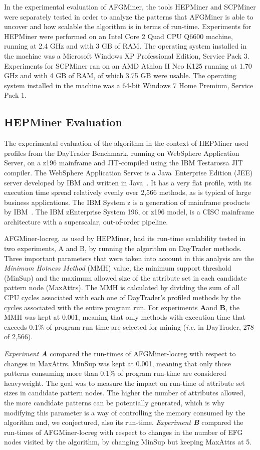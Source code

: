 In the experimental evaluation of AFGMiner, the tools HEPMiner and SCPMiner were separately tested in order to analyze the patterns that AFGMiner is able to uncover and how scalable the algorithm is in terms of run-time. Experiments for HEPMiner were performed on an Intel Core 2 Quad CPU Q6600 machine, running at 2.4 GHz and with 3 GB of RAM. The operating system installed in the machine was a Microsoft Windows XP Professional Edition, Service Pack 3. Experiments for SCPMiner ran on an AMD Athlon II Neo K125 running at 1.70 GHz and with 4 GB of RAM, of which 3.75 GB were usable. The operating system installed in the machine was a 64-bit Windows 7 Home Premium, Service Pack 1.

\subsection{HEPMiner Evaluation}
The experimental evaluation of the algorithm in the context of HEPMiner used profiles from the DayTrader Benchmark, running on WebSphere Application Server, on a z196 mainframe and JIT-compiled using the IBM Testarossa JIT compiler. The WebSphere Application Server is a Java\textregistered~Enterprise Edition (JEE) server developed by IBM and written in Java~\cite{WAS}. It has a very flat profile, with its execution time spread relatively evenly over 2,566 methods, as is typical of large business applications. The IBM System z is a generation of mainframe products by IBM~\cite{zEnterprise}. The IBM zEnterprise System 196, or z196 model, is a CISC mainframe architecture with a superscalar, out-of-order pipeline.

AFGMiner-locreg, as used by HEPMiner, had its run-time scalability tested in two experiments, A and B, by running the algorithm on DayTrader methods. Three important parameters that were taken into account in this analysis are the \emph{Minimum Hotness Method} (MMH) value, the minimum support threshold (MinSup) and the maximum allowed size of the attribute set in each candidate pattern node (MaxAttrs). The MMH is calculated by dividing the sum of all CPU cycles associated with each one of DayTrader's profiled methods by the cycles associated with the entire program run. For experiments {\bf A}and {\bf B}, the MMH was kept at 0.001, meaning that only methods with execution time that exceeds 0.1\% of program run-time are selected for mining (\emph{i.e.} in DayTrader, 278 of 2,566).

\emph{Experiment {\bf A}} compared the run-times of AFGMiner-locreg with respect to changes in MaxAttrs. MinSup was kept at 0.001, meaning that only those patterns consuming more than 0.1\% of program run-time are considered heavyweight. The goal was to measure the impact on run-time of attribute set sizes in candidate pattern nodes. The higher the number of attributes allowed, the more candidate patterns can be potentially generated, which is why modifying this parameter is a way of controlling the memory consumed by the algorithm and, we conjectured, also its run-time. \emph{Experiment {\bf B}} compared the run-times of AFGMiner-locreg with respect to changes in the number of EFG nodes visited by the algorithm, by changing MinSup but keeping MaxAttrs at 5.

